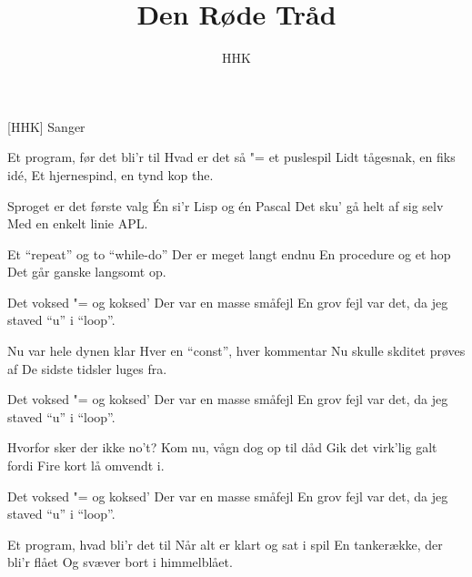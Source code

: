 \documentclass[a4paper,11pt]{article}
\title{Den Røde Tråd}
\author{HHK}
\begin{document}
\maketitle

\begin{roles}
[HHK] Sanger
\end{roles}

\begin{song}
Et program, før det bli'r til
Hvad er det så "= et puslespil
Lidt tågesnak, en fiks idé,
Et hjernespind, en tynd kop the.

Sproget er det første valg
Én si'r Lisp og én Pascal
Det sku' gå helt af sig selv
Med en enkelt linie APL.

Et "`repeat"' og to "`while-do"'
Der er meget langt endnu
En procedure og et hop
Det går ganske langsomt op.

Det voksed "= og koksed'
Der var en masse småfejl
En grov fejl var det, da jeg staved "`u"' i "`loop"'.

Nu var hele dynen klar
Hver en "`const"', hver kommentar
Nu skulle skditet prøves af
De sidste tidsler luges fra.

Det voksed "= og koksed'
Der var en masse småfejl
En grov fejl var det, da jeg staved "`u"' i "`loop"'.

Hvorfor sker der ikke no't?
Kom nu, vågn dog op til dåd
Gik det virk'lig galt fordi
Fire kort lå omvendt i.

Det voksed "= og koksed'
Der var en masse småfejl
En grov fejl var det, da jeg staved "`u"' i "`loop"'.

Et program, hvad bli'r det til
Når alt er klart og sat i spil
En tankerække, der bli'r flået
Og svæver bort i himmelblået.

\end{song}
\end{document}
